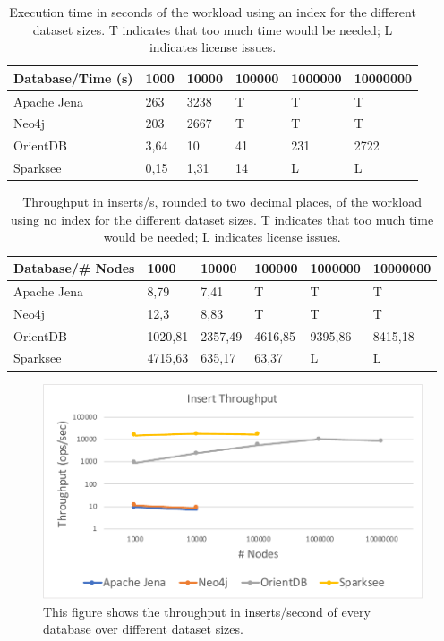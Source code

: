 \begin{table}[h!]
  \begin{minipage}{\textwidth}
    \centering
    \begin{tabularx}{\textwidth}{ | l | X | X | X | X | X | }
      \hline
      Database/Time (s) & 1000 & 10000 & 100000 & 1000000 & 10000000 \\ \hline
      Apache Jena & 263 & 3238 & T & T & T \\ \hline
      Neo4j & 203 & 2667 & T & T & T \\ \hline
      OrientDB & 3,64 & 10 & 41 & 231 & 2722 \\ \hline
      Sparksee & 0,15 & 1,31 & 14 & L & L \\ \hline
    \end{tabularx}
  \end{minipage}
  \caption{Execution time in seconds of the workload using an index for the different dataset sizes. T indicates that too much time would be needed; L indicates license issues.}
  \label{tab:withIndexExecutionTime}
\end{table}

\begin{table}[h!]
  \begin{minipage}{\textwidth}
    \centering
    \begin{tabularx}{\textwidth}{ | l | X | X | X | X | X | }
      \hline
      Database/\# Nodes & 1000 & 10000 & 100000 & 1000000 & 10000000 \\ \hline
      Apache Jena & 8,79 & 7,41 & T & T & T \\ \hline
      Neo4j & 12,3 & 8,83 & T & T & T \\ \hline
      OrientDB & 1020,81 & 2357,49 & 4616,85 & 9395,86 & 8415,18 \\ \hline
      Sparksee & 4715,63 & 635,17 & 63,37 & L & L \\ \hline
    \end{tabularx}
  \end{minipage}
  \caption{Throughput in inserts/s, rounded to two decimal places, of the workload using no index for the different dataset sizes. T indicates that too much time would be needed; L indicates license issues.}
  \label{tab:withoutIndexThroughput}
\end{table}

\begin{figure}[h!]
  \centering
  \includegraphics[width=.75\textwidth]{images/throughput/withIndexThroughput}
  \caption{This figure shows the throughput in inserts/second of every database over different dataset sizes.}
  \label{fig:withIndexThroughput}
\end{figure}

